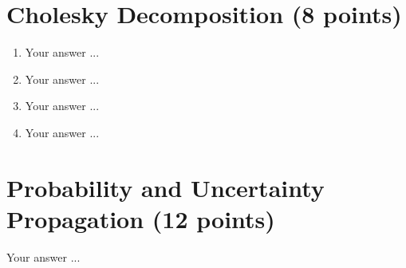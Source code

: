 \documentclass[11pt, oneside, letter]{article}
\begin{document}
\section{Cholesky Decomposition (8 points)}
\begin{enumerate}
\item[] Your answer ...

\item[] Your answer ...

\item[] Your answer ...

\item[] Your answer ...

\end{enumerate}


\section{Probability and Uncertainty Propagation (12 points)}

Your answer ...
\end{document}
